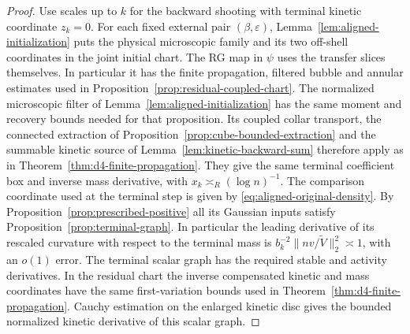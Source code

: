 \documentclass[11pt]{article}
\theoremstyle{definition}
\begin{document}
\begin{proof}
Use scales up to \(k\) for the backward shooting with terminal
kinetic coordinate \(z_k=0\). For each fixed external pair
\((\beta,\varepsilon)\), Lemma~\ref{lem:aligned-initialization}
puts the physical microscopic family and its two off-shell
coordinates in the joint initial chart. The RG map in \(\psi\)
uses the transfer slices themselves. In particular it has the
finite propagation, filtered bubble and annular estimates used in
Proposition~\ref{prop:residual-coupled-chart}. The normalized
microscopic filter of Lemma~\ref{lem:aligned-initialization}
has the same moment and recovery bounds needed for that
proposition. Its coupled collar transport, the connected
extraction of Proposition~\ref{prop:cube-bounded-extraction}
and the summable kinetic source of
Lemma~\ref{lem:kinetic-backward-sum} therefore apply as in
Theorem~\ref{thm:d4-finite-propagation}. They give the same
terminal coefficient box and inverse mass derivative, with
\(x_k\asymp_R(\log n)^{-1}\). The comparison coordinate
used at the terminal step is given by
\eqref{eq:aligned-original-density}. By
Proposition~\ref{prop:prescribed-positive} all its Gaussian
inputs satisfy Proposition~\ref{prop:terminal-graph}.
In particular the leading derivative of its rescaled curvature
with respect to the terminal mass is
\(b_k^{-2}\|nv/\widetilde V\|_2^2\asymp1\), with an \(o(1)\)
error. The terminal scalar graph has the required stable and
activity derivatives. In the residual chart the inverse compensated kinetic and mass
coordinates have the same first-variation bounds used in
Theorem~\ref{thm:d4-finite-propagation}. Cauchy estimation
on the enlarged kinetic disc gives the bounded normalized
kinetic derivative of this scalar graph.


\end{proof}
\end{document}

